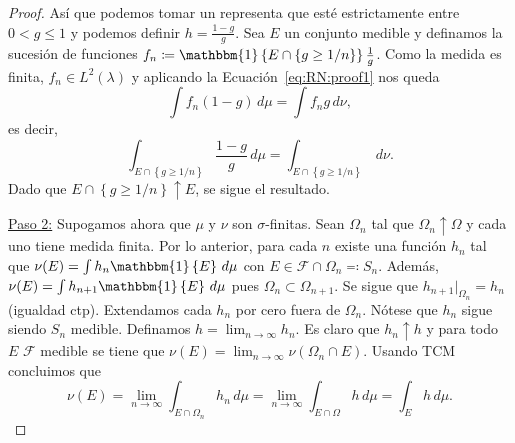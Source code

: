 \documentclass{article}
\theoremstyle{plain}
\theoremstyle{definition}
\newcommand{\1}[1]{\mathbbm{1}\left\{ #1 \right\}}
\begin{document}
\begin{proof}
  Así que podemos tomar un representa que esté estrictamente entre \(0 < g \le 1\) y 
  podemos definir \(h = \frac{1-g}{g}\). Sea \(E\) un conjunto medible y definamos la sucesión
  de funciones \(f_n \coloneqq \1{E\cap\left\{ g\ge 1/n \right\}} \frac{1}{g}\). Como la medida
  es finita, \(f_n\in L^2(\lambda)\) y aplicando la Ecuación~\eqref{eq:RN:proof1} nos queda
  \begin{displaymath}
    \int f_n (1-g) \, d\mu = \int f_n g \, d\nu,
  \end{displaymath}
  es decir,
  \begin{displaymath}
    \int_{E\cap \left\{ g \ge 1/n \right\}} \frac{1-g}{g} \, d\mu
    =
    \int_{E\cap \left\{ g \ge 1/n \right\}} \, d\nu.
  \end{displaymath}
  Dado que \(E\cap \left\{ g\ge 1/n \right\} \uparrow E\), se sigue el resultado.
  
  \underline{Paso 2:} Supogamos ahora que \(\mu\) y \(\nu\) son \(\sigma\)-finitas. Sean 
  \(\Omega_n\) tal que \(\Omega_n \uparrow \Omega\) y cada uno tiene medida finita.
  Por lo anterior, para cada \(n\) existe una función \(h_n\) tal que
  \(\nu(E) = \int h_n \1{E} \, d\mu\) con \(E \in \mathcal{F}\cap \Omega_n \eqqcolon S_n\). 
  Además, \(\nu(E) = \int h_{n+1} \1{E} \, d\mu\) pues \(\Omega_n \subset \Omega_{n+1}\). Se sigue
  que \(h_{n+1}\vert_{\Omega_n} = h_n\) (igualdad ctp). Extendamos cada \(h_n\) por cero fuera
  de \(\Omega_n\). Nótese que \(h_n\) sigue siendo \(S_n\) medible. Definamos
  \(h = \lim_{n\to \infty} h_n\). Es claro que \(h_n \uparrow h\) y para todo \(E\) \(\mathcal{F}\)    
  medible se tiene que \(\nu(E) = \lim_{n\to\infty} \nu(\Omega_n\cap E)\). Usando TCM concluimos que
  \begin{displaymath}
    \nu(E) 
    = \lim_{n\to\infty} \int_{E\cap\Omega_n} h_n \, d\mu
    = \lim_{n\to\infty} \int_{E\cap\Omega} h \, d\mu
    = \int_{E} h \, d\mu.
  \end{displaymath}
\end{proof}
\end{document}
